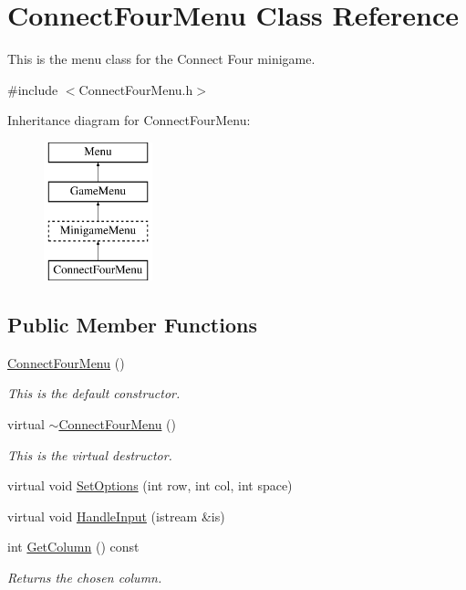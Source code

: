 \hypertarget{classConnectFourMenu}{\section{Connect\-Four\-Menu Class Reference}
\label{classConnectFourMenu}
}


This is the menu class for the Connect Four minigame.  




{\ttfamily \#include $<$Connect\-Four\-Menu.\-h$>$}

Inheritance diagram for Connect\-Four\-Menu\-:\begin{figure}[H]
\begin{center}
\leavevmode
\includegraphics[height=4.000000cm]{classConnectFourMenu}
\end{center}
\end{figure}
\subsection*{Public Member Functions}
\begin{DoxyCompactItemize}
\item 
\hyperlink{classConnectFourMenu_a368513cbf367d7014e664667dbbb94ae}{Connect\-Four\-Menu} ()
\begin{DoxyCompactList}\small\item\em This is the default constructor. \end{DoxyCompactList}\item 
virtual \hyperlink{classConnectFourMenu_a53789934922dbbd5bfa5be90e69dfcb4}{$\sim$\-Connect\-Four\-Menu} ()
\begin{DoxyCompactList}\small\item\em This is the virtual destructor. \end{DoxyCompactList}\item 
virtual void \hyperlink{classConnectFourMenu_a6a826d0810795584cfb4b601d5cd5df2}{Set\-Options} (int row, int col, int space)
\item 
virtual void \hyperlink{classConnectFourMenu_a2af0c62dd776dd0e3d8c212f71eb3219}{Handle\-Input} (istream \&is)
\item 
int \hyperlink{classConnectFourMenu_a22ebfd1c6dac4040f023edd348191a0e}{Get\-Column} () const 
\begin{DoxyCompactList}\small\item\em Returns the chosen column. \end{DoxyCompactList}\end{DoxyCompactItemize}

